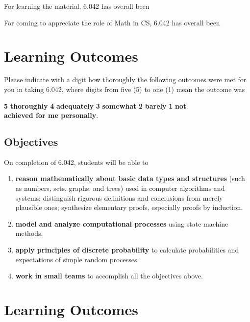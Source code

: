 \documentclass[handout]{mcs}
\begin{document}
For learning the material, 6.042 has overall been  \hfill \brule{0.5in}

For coming to appreciate the role of
Math in CS, 6.042 has overall been \hfill \brule{0.5in}

\newpage
\section*{Learning Outcomes}

Please indicate with a digit how thoroughly the following outcomes
were met for you in taking 6.042, where digits from five (5) to one
(1) mean the outcome was
\begin{center}
\textbf{5}  \textbf{thoroughly} \qquad
\textbf{4}  \textbf{adequately}\qquad
\textbf{3} \textbf{somewhat}\qquad
\textbf{2} \textbf{barely}\qquad
\textbf{1} \textbf{not}\\

\textbf{achieved for me personally}.
\end{center}

\iffalse

\subsection{Objectives}
On completion of 6.042, students will be able to
\begin{enumerate}
\item
\label{Basic Discrete Mathematics Concepts}
\textbf{reason mathematically about basic data types and structures} (such
as numbers, sets, graphs, and trees) used in computer algorithms and
systems; distinguish rigorous definitions and conclusions from merely
plausible ones; synthesize elementary proofs, especially proofs by
induction.\brule{0.5in}

\item
\label{Computational Processes} 
\textbf{model and analyze computational processes} using state machine
methods.\brule{0.5in}

\item \label{Discrete Probability} \textbf{apply principles of discrete
probability} to calculate probabilities and expectations of simple random
processes.\brule{0.5in}

\item 
\label{teams} 
\textbf{work in small teams} to accomplish all the objectives above.\brule{0.5in}
\end{enumerate}

\section*{Learning Outcomes}
\end{document}
